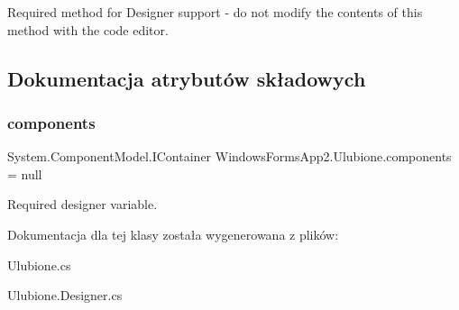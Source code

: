 Required method for Designer support -\/ do not modify the contents of this method with the code editor. 



\subsection{Dokumentacja atrybutów składowych}
\mbox{\label{class_windows_forms_app2_1_1_ulubione_a87e8bd4b55cd5b901060d298a6519aaa}} 
\subsubsection{\texorpdfstring{components}{components}}
{\footnotesize\ttfamily System.\+Component\+Model.\+I\+Container Windows\+Forms\+App2.\+Ulubione.\+components = null\hspace{0.3cm}{\ttfamily [private]}}



Required designer variable. 



Dokumentacja dla tej klasy została wygenerowana z plików\+:\begin{DoxyCompactItemize}
\item 
Ulubione.\+cs\item 
Ulubione.\+Designer.\+cs\end{DoxyCompactItemize}
